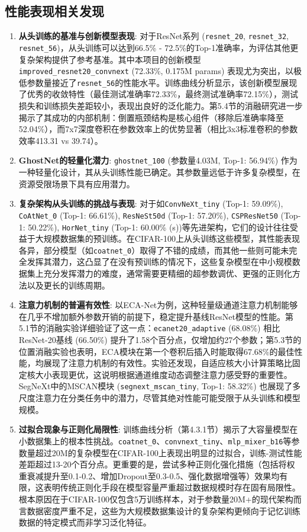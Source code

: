 \documentclass[a4paper]{article}
\begin{document}
\subsection{性能表现相关发现}
\begin{enumerate}
    \item \textbf{从头训练的基准与创新模型表现}: 对于ResNet系列 (\texttt{resnet\_20}, \texttt{resnet\_32}, \texttt{resnet\_56})，从头训练可以达到66.5\% - 72.5\%的Top-1准确率，为评估其他更复杂架构提供了参考基准。其中本项目的创新模型\texttt{improved\_resnet20\_convnext} (72.33\%, 0.175M params) 表现尤为突出，以极低参数量接近了\texttt{resnet\_56}的性能水平。训练曲线分析显示，该创新模型展现了优秀的收敛特性（最佳测试准确率72.33\%，最终测试准确率72.15\%），测试损失和训练损失差距较小，表现出良好的泛化能力。第5.4节的消融研究进一步揭示了其成功的内部机制：倒置瓶颈结构是核心组件（移除后准确率降至52.04\%），而7x7深度卷积在参数效率上的优势显著（相比3x3标准卷积的参数效率413.31 vs 39.74）。
    \item \textbf{GhostNet的轻量化潜力}: \texttt{ghostnet\_100} (参数量4.03M, Top-1: 56.94\%) 作为一种轻量化设计，其从头训练性能已确定。其参数量远低于许多复杂模型，在资源受限场景下具有应用潜力。
    \item \textbf{复杂架构从头训练的挑战与表现}: 对于如\texttt{ConvNeXt\_tiny} (Top-1: 59.09\%), \texttt{CoAtNet\_0} (Top-1: 66.61\%), \texttt{ResNeSt50d} (Top-1: 57.20\%), \texttt{CSPResNet50} (Top-1: 50.22\%), \texttt{HorNet\_tiny} (Top-1: 60.00\% (s))等先进架构，它们的设计往往受益于大规模数据集的预训练。在CIFAR-100上从头训练这些模型，其性能表现各异，部分模型（如\texttt{coatnet\_0}）取得了不错的成绩，而其他一些则可能未完全发挥其潜力，这凸显了在没有预训练的情况下，这些复杂模型在中小规模数据集上充分发挥潜力的难度，通常需要更精细的超参数调优、更强的正则化方法以及更长的训练周期。
    \item \textbf{注意力机制的普遍有效性}: 以ECA-Net为例，这种轻量级通道注意力机制能够在几乎不增加额外参数开销的前提下，稳定提升基线ResNet模型的性能。第5.1节的消融实验详细验证了这一点：\texttt{ecanet20\_adaptive} (68.08\%) 相比ResNet-20基线 (66.50\%) 提升了1.58个百分点，仅增加约27个参数；第5.3节的位置消融实验也表明，ECA模块在第一个卷积后插入时能取得67.68\%的最佳性能，均展现了注意力机制的有效性。实验还发现，自适应核大小计算策略比固定核大小表现更优，这说明根据通道维度动态调整注意力感受野的重要性。SegNeXt中的MSCAN模块 (\texttt{segnext\_mscan\_tiny}, Top-1: 58.32\%) 也展现了多尺度注意力在分类任务中的潜力，尽管其绝对性能可能受限于从头训练和模型规模。
    \item \textbf{过拟合现象与正则化局限性}: 训练曲线分析（第4.3.1节）揭示了大容量模型在小数据集上的根本性挑战。\texttt{coatnet\_0}、\texttt{convnext\_tiny}、\texttt{mlp\_mixer\_b16}等参数量超过20M的复杂模型在CIFAR-100上表现出明显的过拟合，训练-测试性能差距超过13-20个百分点。更重要的是，尝试多种正则化强化措施（包括将权重衰减提升至0.1-0.2、增加Dropout至0.3-0.5、强化数据增强等）效果均有限，这表明传统正则化手段在模型容量严重超过数据规模时存在固有局限性。根本原因在于CIFAR-100仅包含5万训练样本，对于参数量20M+的现代架构而言数据密度严重不足，这些为大规模数据集设计的复杂架构更倾向于记忆训练数据的特定模式而非学习泛化特征。

\end{enumerate}
\end{document}
